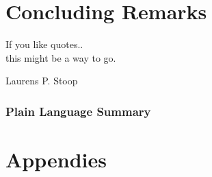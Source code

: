 \documentclass[]{dissertation}
\begin{document}
\setcounter{colorcounter}{4}
\part[Concluding remarks]{Concluding Remarks}
\label{part:conclusion}


\epigraph{
       If you like quotes.. \\ this might be a way to go.
}{Laurens P. Stoop}

\section*{Plain Language Summary}
\lipsum[1337]


\newpage
\chaptoc








% 





\cleardoublepage






\appendix

\setcounter{colorcounter}{5}
\part[Appendices]{Appendies}
\label{part:appendix}

\chaptoc
\end{document}
